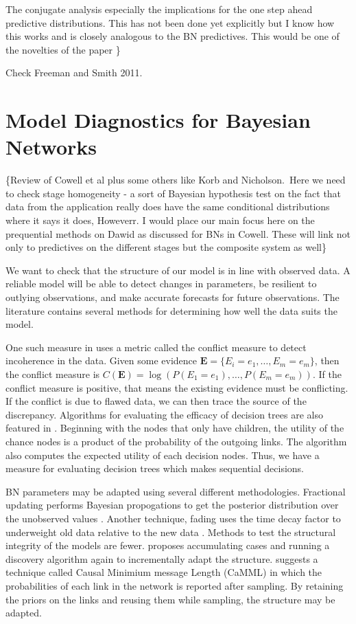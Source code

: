 \documentclass[12pt]{article}
\begin{document}
 The conjugate analysis especially the implications for the one step
ahead predictive distributions. This has not been done yet explicitly but I
know how this works and is closely analogous to the BN predictives. This
would be one of the novelties of the paper \}

Check Freeman and Smith 2011.



\section{Model Diagnostics for Bayesian Networks}

\{Review of Cowell et al plus some others like Korb and Nicholson.\ Here we
need to check stage homogeneity - a sort of Bayesian hypothesis test on the
fact that data from the application really does have the same conditional
distributions where it says it does, Howeverr. I would place our main focus
here on the prequential methods on Dawid as discussed for BNs in Cowell.
These will link not only to predictives on the different stages but the
composite system as well\}

We want to check that the structure of our model is in line with observed data. A reliable model will be able to detect changes in parameters, be resilient to outlying observations, and make accurate forecasts for future observations\cite{Dawid1984}. The literature contains several methods for determining how well the data suits the model. 

One such measure in \cite{KORB} uses a metric called the conflict measure to detect incoherence in the data. Given some evidence $\bm{E}=\{E_i=e_1,\ldots,E_m=e_m\}$, then the conflict measure is $C(\bm{E})=\log(P(E_1=e_1),\ldots,P(E_m=e_m))$. If the conflict measure is positive, that means the existing evidence must be conflicting. If the conflict is due to flawed data, we can then trace the source of the discrepancy. Algorithms for evaluating the efficacy of decision trees are also featured in \cite{KORB}. Beginning with the nodes that only have children, the utility of the chance nodes is a product of the probability of the outgoing links. The algorithm also computes the expected utility of each decision nodes. Thus, we have a measure for evaluating decision trees which makes sequential decisions. 

BN parameters may be adapted using several different methodologies. Fractional updating performs Bayesian propogations to get the posterior distribution over the unobserved values \cite{Spiegelhalter and Lauritzen}. Another technique, fading uses the time decay factor to underweight old data relative to the new data \cite{JENSEN}. Methods to test the structural integrity of the models are fewer. \cite{JENSEN} proposes accumulating cases and running a discovery algorithm again to incrementally adapt the structure. \cite{KORB} suggests a technique called Causal Minimium message Length (CaMML) in which the probabilities of each link in the network is reported after sampling. By retaining the priors on the links and reusing them while sampling, the structure may be adapted. 
\end{document}
